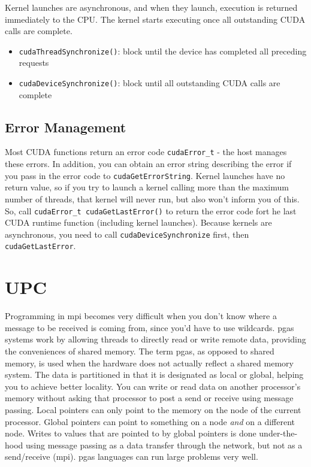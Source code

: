 \documentclass[10pt]{article}
\begin{document}
\begin{flushleft}
Kernel launches are asynchronous, and when they launch, execution is returned immediately to the CPU. The kernel starts executing once all outstanding CUDA calls are complete. 

\begin{itemize}
\item {\tt cudaThreadSynchronize()}: block until the device has completed all preceding requests
\item {\tt cudaDeviceSynchronize()}: block until all outstanding CUDA calls are complete
\end{itemize}

\subsection{Error Management}

Most CUDA functions return an error code {\tt cudaError\_t} - the host manages these errors. In addition, you can obtain an error string describing the error if you pass in the error code to {\tt cudaGetErrorString}. Kernel launches have no return value, so if you try to launch a kernel calling more than the maximum number of threads, that kernel will never run, but also won't inform you of this. So, call {\tt cudaError\_t cudaGetLastError()} to return the error code fort he last CUDA runtime function (including kernel launches). Because kernels are asynchronous, you need to call {\tt cudaDeviceSynchronize} first, then {\tt cudaGetLastError}. 

 
 
 
\section{UPC}



Programming in \gls{mpi} becomes very difficult when you don't know where a message to be received is coming from, since you'd have to use wildcards. \gls{pgas} systems work by allowing threads to directly read or write remote data, providing the conveniences of shared memory. The term \gls{pgas}, as opposed to shared memory, is used when the hardware does not actually reflect a shared memory system. The data is partitioned in that it is designated as local or global, helping you to achieve better locality. You can write or read data on another processor's memory without asking that processor to post a send or receive using message passing. Local pointers can only point to the memory on the node of the current processor. Global pointers can point to something on a node \textit{and} on a different node. Writes to values that are pointed to by global pointers is done under-the-hood using message passing as a data transfer through the network, but not as a send/receive (\gls{mpi}). \gls{pgas} languages can run large problems very well.


\end{flushleft}
\end{document}
